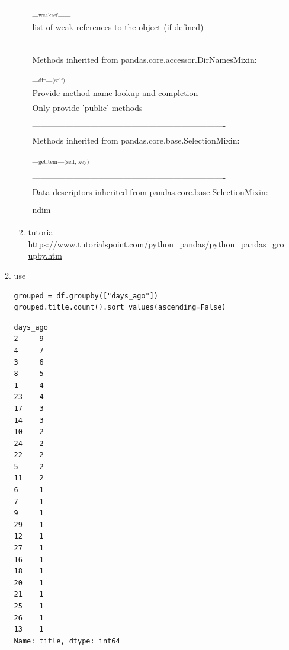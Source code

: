 \documentclass[11pt]{article}
\begin{document}
\begin{enumerate}
\begin{enumerate}
\begin{enumerate}
\begin{center}
\begin{tabular}{l}
\\
\_\(_{\text{weakref}}\)\_\_\\
list of weak references to the object (if defined)\\
\\
----------------------------------------------------------------------\\
Methods inherited from pandas.core.accessor.DirNamesMixin:\\
\\
\_\(_{\text{dir}}\)\_\(_{\text{(self)}}\)\\
Provide method name lookup and completion\\
Only provide 'public' methods\\
\\
----------------------------------------------------------------------\\
Methods inherited from pandas.core.base.SelectionMixin:\\
\\
\_\(_{\text{getitem}}\)\_\(_{\text{(self, key)}}\)\\
\\
----------------------------------------------------------------------\\
Data descriptors inherited from pandas.core.base.SelectionMixin:\\
\\
ndim\\
\end{tabular}
\end{center}
\item tutorial
\label{sec:orgc8e5a4b}
\url{https://www.tutorialspoint.com/python\_pandas/python\_pandas\_groupby.htm}
\end{enumerate}
\item use
\label{sec:org56c7e03}
\begin{verbatim}
grouped = df.groupby(["days_ago"])
grouped.title.count().sort_values(ascending=False)
\end{verbatim}

\begin{verbatim}
days_ago
2     9
4     7
3     6
8     5
1     4
23    4
17    3
14    3
10    2
24    2
22    2
5     2
11    2
6     1
7     1
9     1
29    1
12    1
27    1
16    1
18    1
20    1
21    1
25    1
26    1
13    1
Name: title, dtype: int64
\end{verbatim}
\end{enumerate}
\end{enumerate}
\end{document}
